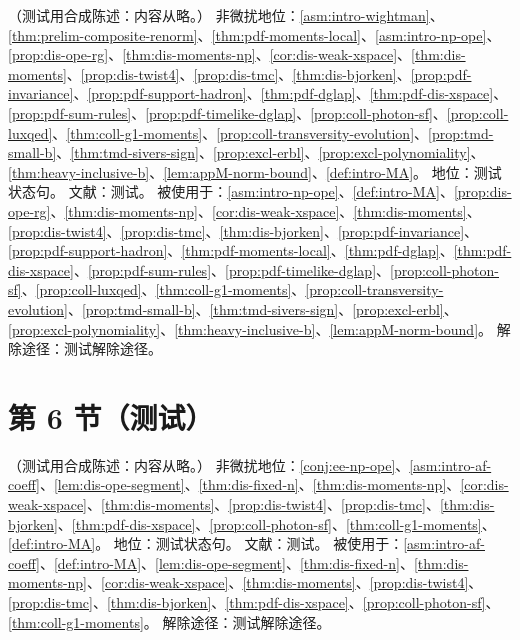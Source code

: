\begin{assumption}\label{asm:intro-composite}
（测试用合成陈述：内容从略。）
非微扰地位：\cref{asm:intro-wightman}、\cref{thm:prelim-composite-renorm}、\cref{thm:pdf-moments-local}、\cref{asm:intro-np-ope}、\cref{prop:dis-ope-rg}、\cref{thm:dis-moments-np}、\cref{cor:dis-weak-xspace}、\cref{thm:dis-moments}、\cref{prop:dis-twist4}、\cref{prop:dis-tmc}、\cref{thm:dis-bjorken}、\cref{prop:pdf-invariance}、\cref{prop:pdf-support-hadron}、\cref{thm:pdf-dglap}、\cref{thm:pdf-dis-xspace}、\cref{prop:pdf-sum-rules}、\cref{prop:pdf-timelike-dglap}、\cref{prop:coll-photon-sf}、\cref{prop:coll-luxqed}、\cref{thm:coll-g1-moments}、\cref{prop:coll-transversity-evolution}、\cref{prop:tmd-small-b}、\cref{thm:tmd-sivers-sign}、\cref{prop:excl-erbl}、\cref{prop:excl-polynomiality}、\cref{thm:heavy-inclusive-b}、\cref{lem:appM-norm-bound}、\cref{def:intro-MA}。
地位：测试状态句。
文献：测试。
被使用于：\cref{asm:intro-np-ope}、\cref{def:intro-MA}、\cref{prop:dis-ope-rg}、\cref{thm:dis-moments-np}、\cref{cor:dis-weak-xspace}、\cref{thm:dis-moments}、\cref{prop:dis-twist4}、\cref{prop:dis-tmc}、\cref{thm:dis-bjorken}、\cref{prop:pdf-invariance}、\cref{prop:pdf-support-hadron}、\cref{thm:pdf-moments-local}、\cref{thm:pdf-dglap}、\cref{thm:pdf-dis-xspace}、\cref{prop:pdf-sum-rules}、\cref{prop:pdf-timelike-dglap}、\cref{prop:coll-photon-sf}、\cref{prop:coll-luxqed}、\cref{thm:coll-g1-moments}、\cref{prop:coll-transversity-evolution}、\cref{prop:tmd-small-b}、\cref{thm:tmd-sivers-sign}、\cref{prop:excl-erbl}、\cref{prop:excl-polynomiality}、\cref{thm:heavy-inclusive-b}、\cref{lem:appM-norm-bound}。
解除途径：测试解除途径。
\end{assumption}

\section{第 6 节（测试）}\label{sec:intro-overview}

\begin{assumption}\label{asm:intro-np-ope}
（测试用合成陈述：内容从略。）
非微扰地位：\cref{conj:ee-np-ope}、\cref{asm:intro-af-coeff}、\cref{lem:dis-ope-segment}、\cref{thm:dis-fixed-n}、\cref{thm:dis-moments-np}、\cref{cor:dis-weak-xspace}、\cref{thm:dis-moments}、\cref{prop:dis-twist4}、\cref{prop:dis-tmc}、\cref{thm:dis-bjorken}、\cref{thm:pdf-dis-xspace}、\cref{prop:coll-photon-sf}、\cref{thm:coll-g1-moments}、\cref{def:intro-MA}。
地位：测试状态句。
文献：测试。
被使用于：\cref{asm:intro-af-coeff}、\cref{def:intro-MA}、\cref{lem:dis-ope-segment}、\cref{thm:dis-fixed-n}、\cref{thm:dis-moments-np}、\cref{cor:dis-weak-xspace}、\cref{thm:dis-moments}、\cref{prop:dis-twist4}、\cref{prop:dis-tmc}、\cref{thm:dis-bjorken}、\cref{thm:pdf-dis-xspace}、\cref{prop:coll-photon-sf}、\cref{thm:coll-g1-moments}。
解除途径：测试解除途径。
\end{assumption}

